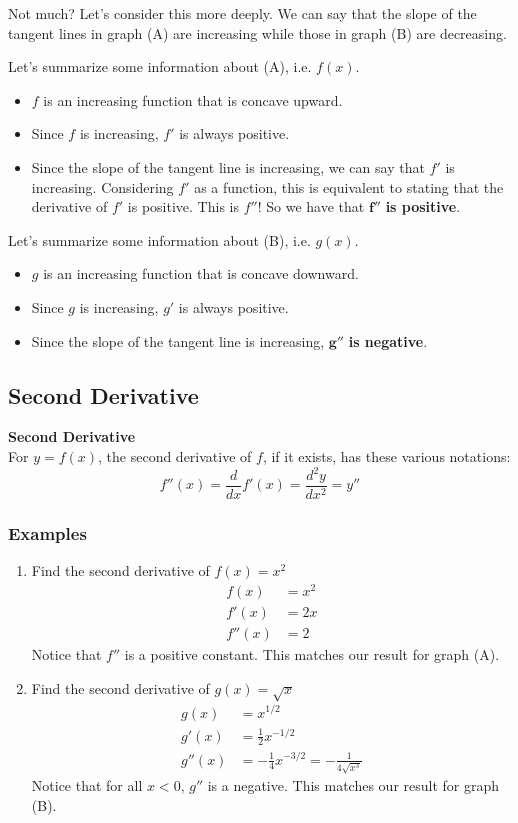 \documentclass[14pt]{extarticle}
\begin{document}
Not much? Let's consider this more deeply. We can say that the slope of the tangent lines in graph (A) are increasing while those in graph (B) are decreasing.

Let's summarize some information about (A), i.e. $f(x)$.
\begin{itemize}
	\item $f$ is an increasing function that is concave upward.
	\item Since $f$ is increasing, $f'$ is always positive.
	\item Since the slope of the tangent line is increasing, we can say that $f'$ is increasing. Considering $f'$ as a function, this is equivalent to stating that the derivative of $f'$ is positive. This is $f''$! So we have that $\mathbf{f''}$ \textbf{is positive}.
\end{itemize}

Let's summarize some information about (B), i.e. $g(x)$.
\begin{itemize}
	\item $g$ is an increasing function that is concave downward.
	\item Since $g$ is increasing, $g'$ is always positive.
	\item Since the slope of the tangent line is increasing, $\mathbf{g''}$ \textbf{is negative}.
\end{itemize}

\subsection{Second Derivative}
\begin{tcolorbox}[enhanced jigsaw,colback=bg,boxrule=0pt,arc=0pt]
	\textbf{Second Derivative} \\
	For $y=f(x)$, the second derivative of $f$, if it exists, has these various notations:
	$$f''(x) = \frac{d}{dx}f'(x)=\frac{d^2y}{dx^2}=y''$$
\end{tcolorbox}

\subsubsection{Examples}
\begin{enumerate}
	\item Find the second derivative of $f(x) = x^2$
	\begin{align*}
		f(x) &= x^2 \\
		f'(x) &= 2x \\
		f''(x) &= 2
	\end{align*}
	Notice that $f''$ is a positive constant. This matches our result for graph (A).
	\item Find the second derivative of $g(x) = \sqrt{x}$
	\begin{align*}
		g(x) &= x^{1/2} \\
		g'(x) &= \frac{1}{2}x^{-1/2} \\
		g''(x) &= -\frac{1}{4}x^{-3/2} =  -\frac{1}{4\sqrt{x^3}}
	\end{align*}
	Notice that for all $x<0$, $g''$ is a negative. This matches our result for graph (B).
\end{enumerate}
\end{document}
